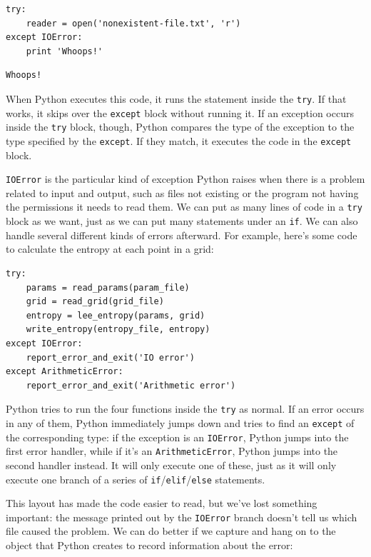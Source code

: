 \documentclass[]{book}
\begin{document}
\begin{verbatim}
try:
    reader = open('nonexistent-file.txt', 'r')
except IOError:
    print 'Whoops!'
\end{verbatim}

\begin{verbatim}
Whoops!
\end{verbatim}

When Python executes this code, it runs the statement inside the
\texttt{try}. If that works, it skips over the \texttt{except} block
without running it. If an exception occurs inside the \texttt{try}
block, though, Python compares the type of the exception to the type
specified by the \texttt{except}. If they match, it executes the code in
the \texttt{except} block.

\texttt{IOError} is the particular kind of exception Python raises when
there is a problem related to input and output, such as files not
existing or the program not having the permissions it needs to read
them. We can put as many lines of code in a \texttt{try} block as we
want, just as we can put many statements under an \texttt{if}. We can
also handle several different kinds of errors afterward. For example,
here's some code to calculate the entropy at each point in a grid:

\begin{verbatim}
try:
    params = read_params(param_file)
    grid = read_grid(grid_file)
    entropy = lee_entropy(params, grid)
    write_entropy(entropy_file, entropy)
except IOError:
    report_error_and_exit('IO error')
except ArithmeticError:
    report_error_and_exit('Arithmetic error')
\end{verbatim}

Python tries to run the four functions inside the \texttt{try} as
normal. If an error occurs in any of them, Python immediately jumps down
and tries to find an \texttt{except} of the corresponding type: if the
exception is an \texttt{IOError}, Python jumps into the first error
handler, while if it's an \texttt{ArithmeticError}, Python jumps into
the second handler instead. It will only execute one of these, just as
it will only execute one branch of a series of
\texttt{if}/\texttt{elif}/\texttt{else} statements.

This layout has made the code easier to read, but we've lost something
important: the message printed out by the \texttt{IOError} branch
doesn't tell us which file caused the problem. We can do better if we
capture and hang on to the object that Python creates to record
information about the error:
\end{document}
